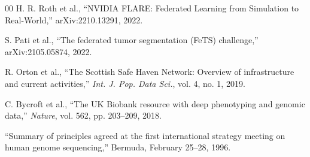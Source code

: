 \documentclass[conference]{IEEEtran}
\begin{document}
\begin{thebibliography}{00}
H. R. Roth et al., ``NVIDIA FLARE: Federated Learning from Simulation to Real-World,'' arXiv:2210.13291, 2022.

S. Pati et al., ``The federated tumor segmentation (FeTS) challenge,'' arXiv:2105.05874, 2022.

R. Orton et al., ``The Scottish Safe Haven Network: Overview of infrastructure and current activities,'' \emph{Int. J. Pop. Data Sci.}, vol. 4, no. 1, 2019.

C. Bycroft et al., ``The UK Biobank resource with deep phenotyping and genomic data,'' \emph{Nature}, vol. 562, pp. 203--209, 2018.

``Summary of principles agreed at the first international strategy meeting on human genome sequencing,'' Bermuda, February 25--28, 1996.

\end{thebibliography}
\end{document}
